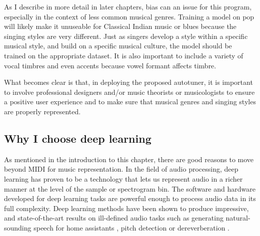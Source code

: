 As I describe in more detail in later chapters, bias can an issue for this program, especially in the context of less common musical genres. Training a model on pop will likely make it unuseable for Classical Indian music or blues because the singing styles are very different. Just as singers develop a style within a specific musical style, and build on a specific musical culture, the model should be trained on the appropriate dataset. It is also important to include a variety of vocal timbres and even accents because vowel formant affects timbre. 

What becomes clear is that, in deploying the proposed autotuner, it is important to involve professional designers and/or music theorists or musicologists to ensure a positive user experience and to make sure that musical genres and singing styles are properly represented.

\subsection{Why I choose deep learning}
As mentioned in the introduction to this chapter, there are good reasons to move beyond MIDI for music representation. In the field of audio processing, deep learning has proven to be a technology that lets us represent audio in a richer manner at the level of the sample or spectrogram bin. The software and hardware developed for deep learning tasks are powerful enough to process audio data in its full complexity. Deep learning methods have been shown to produce impressive, and state-of-the-art results on ill-defined audio tasks such as generating natural-sounding speech for home assistants \cite{oord2016wavenet}, pitch detection \cite{bittner2017deep} or dereverberation \cite{su2020hifi}. 